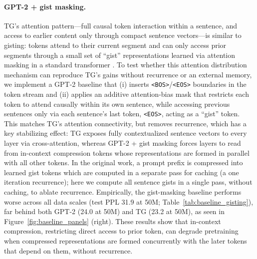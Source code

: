 \documentclass{article}
\begin{document}
\paragraph{GPT-2 + gist masking.}
TG’s attention pattern—full causal token interaction within a sentence, and access to earlier content only through compact sentence vectors—is similar to gisting: tokens attend to their current segment and can only access prior segments through a small set of “gist” representations learned via attention masking in a standard transformer \citep{mu2023gisting}. To test whether this attention distribution mechanism can reproduce TG’s gains without recurrence or an external memory, we implement a GPT-2 baseline that (i) inserts \texttt{<BOS>}/\texttt{<EOS>} boundaries in the token stream and (ii) applies an additive attention-bias mask that restricts each token to attend causally within its own sentence, while accessing previous sentences only via each sentence’s last token, \texttt{<EOS>}, acting as a “gist” token. This matches TG’s attention connectivity, but removes recurrence, which has a key stabilizing effect: TG exposes fully contextualized sentence vectors to every layer via cross-attention, whereas GPT-2 + gist masking forces layers to read from in-context compression tokens whose representations are formed in parallel with all other tokens. In the original work, a prompt prefix is compressed into learned gist tokens which are computed in a separate pass for caching (a one iteration recurrence); here we compute all sentence gists in a single pass, without caching, to ablate recurrence. Empirically, the gist-masking baseline performs worse across all data scales (test PPL 31.9 at 50M; Table~\ref{tab:baseline_gisting}), far behind both GPT-2 (24.0 at 50M) and TG (23.2 at 50M), as seen in Figure~\ref{fig:baseline_panels} (right). These results show that in-context compression, restricting direct access to prior token, can degrade pretraining when compressed representations are formed concurrently with the later tokens that depend on them, without recurrence.
\end{document}
